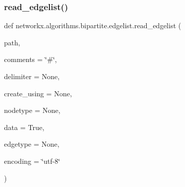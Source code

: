 \subsubsection{\texorpdfstring{read\+\_\+edgelist()}{read\_edgelist()}}
{\footnotesize\ttfamily def networkx.\+algorithms.\+bipartite.\+edgelist.\+read\+\_\+edgelist (\begin{DoxyParamCaption}\item[{}]{path,  }\item[{}]{comments = {\ttfamily \char`\"{}\#\char`\"{}},  }\item[{}]{delimiter = {\ttfamily None},  }\item[{}]{create\+\_\+using = {\ttfamily None},  }\item[{}]{nodetype = {\ttfamily None},  }\item[{}]{data = {\ttfamily True},  }\item[{}]{edgetype = {\ttfamily None},  }\item[{}]{encoding = {\ttfamily \char`\"{}utf-\/8\char`\"{}} }\end{DoxyParamCaption})}


